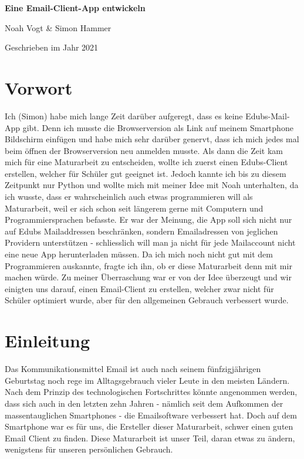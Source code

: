 \documentclass[a4paper,11pt]{article}
\begin{document}
\begin{titlepage}

\vspace*{1cm}
	\centering
	
	{\huge\bfseries Eine Email-Client-App entwickeln \par}
	\vspace{0.5cm}
	{\Large Noah Vogt \& Simon Hammer\par}
	\vspace{17cm}

	{\large Geschrieben im Jahr 2021\par}
	
\end{titlepage}

\tableofcontents
\pagebreak

\section{Vorwort}

Ich (Simon) habe mich lange Zeit darüber aufgeregt, dass es keine Edubs-Mail-App gibt. Denn ich musste die Browserversion als Link auf meinem Smartphone Bildschirm 
einfügen und habe mich sehr darüber genervt, dass ich mich jedes mal beim öffnen der Browserversion neu anmelden musste. Als dann die Zeit kam mich für eine 
Maturarbeit zu entscheiden, wollte ich zuerst einen Edubs-Client erstellen, welcher für Schüler gut geeignet ist. 
Jedoch kannte ich bis zu diesem Zeitpunkt nur Python und wollte mich mit meiner Idee mit Noah unterhalten, 
da ich wusste, dass er wahrscheinlich auch etwas programmieren will als Maturarbeit, weil er sich schon seit längerem gerne mit Computern und Programmiersprachen befasste. Er war der Meinung, die App soll sich nicht nur auf Edubs Mailaddressen beschränken, sondern Emailadressen von jeglichen Providern unterstützen - schliesslich will man ja nicht für jede Mailaccount nicht eine neue App herunterladen müssen.
Da ich mich noch nicht gut mit dem Programmieren auskannte, fragte ich ihn, ob er diese Maturarbeit denn mit mir machen würde.
Zu meiner Überraschung war er von der Idee überzeugt und wir einigten uns darauf, einen Email-Client zu erstellen, welcher zwar nicht für Schüler optimiert wurde, aber für 
den allgemeinen Gebrauch verbessert wurde. 

\section{Einleitung}
Das Kommunikationsmittel Email ist auch nach seinem fünfzigjährigen Geburtstag noch rege im Alltagsgebrauch vieler Leute in den meisten Ländern. Nach dem Prinzip des technologischen Fortschrittes könnte angenommen werden, dass sich auch in den letzten zehn Jahren - nämlich seit dem Aufkommen der massentauglichen Smartphones - die Emailsoftware verbessert hat. Doch auf dem Smartphone war es für uns, die Ersteller dieser Maturarbeit, schwer einen guten Email Client zu finden. Diese Maturarbeit ist unser Teil, daran etwas zu ändern, wenigstens für unseren persönlichen Gebrauch.
\end{document}
